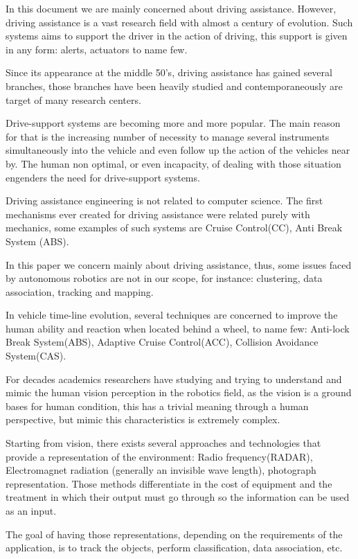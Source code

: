 \documentclass{llncs}
\begin{document}
In this document we are mainly concerned about driving assistance. However, driving assistance is a vast research field with almost a century of evolution. Such systems aims to support the driver in the action of driving, this support is given in any form: alerts, actuators to name few.

Since its appearance at the middle 50's, driving assistance has gained several branches, those branches have been heavily studied and contemporaneously are target of many research centers.

Drive-support systems are becoming more and more popular. The main reason for that is the increasing number of necessity to manage several instruments simultaneously into the vehicle\cite{riener2010sensor} and even follow up the action of the vehicles near by. The human non optimal, or even incapacity, of dealing with those situation engenders the need for drive-support systems.

Driving assistance engineering is not related to computer science. The first mechanisms ever created for driving assistance were related purely with mechanics, some examples of such systems are Cruise Control(CC), Anti Break System (ABS).

In this paper we concern mainly about driving assistance, thus, some issues faced by autonomous robotics are not in our scope, for instance: clustering, data association, tracking and mapping.

In vehicle time-line evolution, several techniques are concerned to improve the human ability and reaction when located behind a wheel, to name few: Anti-lock Break System(ABS), Adaptive Cruise Control(ACC), Collision Avoidance System(CAS).

For decades academics researchers have studying and trying to understand and mimic the human vision perception in the robotics field, as the vision is a ground bases for human condition, this has a trivial meaning through a human perspective, but mimic this characteristics is extremely complex.

Starting from vision, there exists several approaches and technologies that provide a representation of the environment: Radio frequency(RADAR), Electromagnet radiation (generally an invisible wave length), photograph representation. Those methods differentiate in the cost of equipment and the treatment in which their output must go through so the information can be used as an input.

The goal of having those representations, depending on the requirements of the application, is to track the objects, perform classification, data association, etc.
\end{document}
